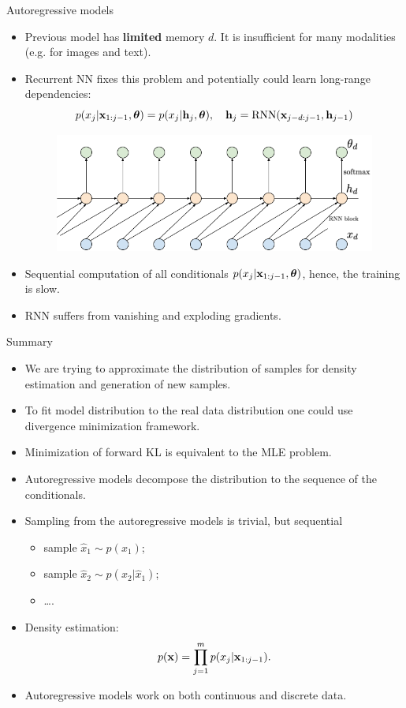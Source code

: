 \begin{frame}{Autoregressive models}
	\begin{itemize}
		\item Previous model has \textbf{limited} memory $d$. It is insufficient for many modalities (e.g. for images and text). 
		\item Recurrent NN fixes this problem and potentially could learn long-range dependencies:
		\[
			p(x_j | \mathbf{x}_{1:j - 1}, \boldsymbol{\theta}) = p(x_j | \mathbf{h}_j, \boldsymbol{\theta}), \quad \mathbf{h}_j = \text{RNN}(\mathbf{x}_{j-d:j - 1}, \mathbf{h}_{j - 1})
		\]
		 \begin{figure}
	    \centering
	    \includegraphics[width=0.7\linewidth]{figs/sequential_RNN}
		 \end{figure}
		\item Sequential computation of all conditionals $p(x_j | \mathbf{x}_{1:j-1}, \boldsymbol{\theta})$, hence, the training is slow.
		\item RNN suffers from vanishing and exploding gradients.
	\end{itemize}
\end{frame}
\begin{frame}{Summary}
    \begin{itemize}
    	\item We are trying to approximate the distribution of samples for density estimation and generation of new samples.
    	\item To fit model distribution to the real data distribution one could use divergence minimization framework.
    	\item Minimization of forward KL is equivalent to the MLE problem.
    	\item Autoregressive models decompose the distribution to the sequence of the conditionals.
        \item Sampling from the autoregressive models is trivial, but sequential
        \begin{itemize}
            \item sample $\hat{x}_1 \sim p(x_1)$;
            \item sample $\hat{x}_2 \sim p(x_2 | \hat{x}_1)$;
            \item \dots.
        \end{itemize}
        \item Density estimation:
        \vspace{-0.2cm}
        \[
            p(\mathbf{x}) = \prod_{j=1}^m p(x_j | \mathbf{x}_{1:j - 1}).
        \]
        \vspace{-0.2cm}
        \item Autoregressive models work on both continuous and discrete data.
    \end{itemize}
\end{frame}

 